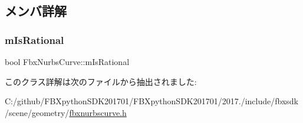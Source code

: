 \subsection{メンバ詳解}
\mbox{\label{class_fbx_nurbs_curve_ac8f0d2eb033d7cc5f8bb906ff67f82bc}} 
\subsubsection{\texorpdfstring{m\+Is\+Rational}{mIsRational}}
{\footnotesize\ttfamily bool Fbx\+Nurbs\+Curve\+::m\+Is\+Rational}



このクラス詳解は次のファイルから抽出されました\+:\begin{DoxyCompactItemize}
\item 
C\+:/github/\+F\+B\+Xpython\+S\+D\+K201701/\+F\+B\+Xpython\+S\+D\+K201701/2017./include/fbxsdk/scene/geometry/\hyperlink{fbxnurbscurve_8h}{fbxnurbscurve.\+h}\end{DoxyCompactItemize}
